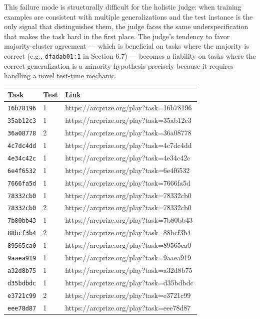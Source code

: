 \documentclass[11pt]{article}
\begin{document}
This failure mode is structurally difficult for the holistic judge: when
training examples are consistent with multiple generalizations and the
test instance is the only signal that distinguishes them, the judge
faces the same underspecification that makes the task hard in the first
place. The judge's tendency to favor majority-cluster agreement ---
which is beneficial on tasks where the majority is correct (e.g.,
\texttt{dfadab01:1} in Section 6.7) --- becomes a liability on tasks
where the correct generalization is a minority hypothesis precisely
because it requires handling a novel test-time mechanic.

\begin{longtable}[]{@{}lll@{}}
\toprule\noalign{}
Task & Test & Link \\
\midrule\noalign{}
\endhead
\bottomrule\noalign{}
\endlastfoot
\texttt{16b78196} & 1 & https://arcprize.org/play?task=16b78196 \\
\texttt{35ab12c3} & 1 & https://arcprize.org/play?task=35ab12c3 \\
\texttt{36a08778} & 2 & https://arcprize.org/play?task=36a08778 \\
\texttt{4c7dc4dd} & 1 & https://arcprize.org/play?task=4c7dc4dd \\
\texttt{4e34c42c} & 1 & https://arcprize.org/play?task=4e34c42c \\
\texttt{6e4f6532} & 1 & https://arcprize.org/play?task=6e4f6532 \\
\texttt{7666fa5d} & 1 & https://arcprize.org/play?task=7666fa5d \\
\texttt{78332cb0} & 1 & https://arcprize.org/play?task=78332cb0 \\
\texttt{78332cb0} & 2 & https://arcprize.org/play?task=78332cb0 \\
\texttt{7b80bb43} & 1 & https://arcprize.org/play?task=7b80bb43 \\
\texttt{88bcf3b4} & 2 & https://arcprize.org/play?task=88bcf3b4 \\
\texttt{89565ca0} & 1 & https://arcprize.org/play?task=89565ca0 \\
\texttt{9aaea919} & 1 & https://arcprize.org/play?task=9aaea919 \\
\texttt{a32d8b75} & 1 & https://arcprize.org/play?task=a32d8b75 \\
\texttt{d35bdbdc} & 1 & https://arcprize.org/play?task=d35bdbdc \\
\texttt{e3721c99} & 2 & https://arcprize.org/play?task=e3721c99 \\
\texttt{eee78d87} & 1 & https://arcprize.org/play?task=eee78d87 \\
\end{longtable}
\end{document}
